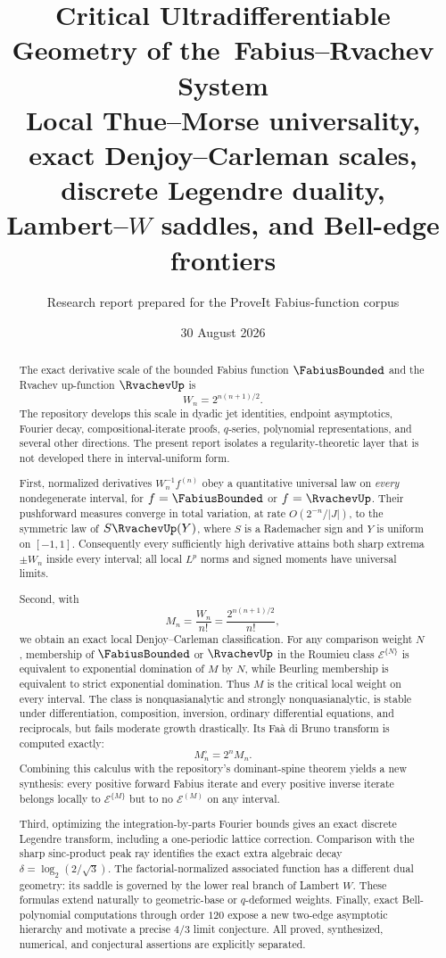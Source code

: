 \documentclass[11pt,a4paper]{article}
\title{\textbf{Critical Ultradifferentiable Geometry of the\ Fabius--Rvachev System}\\[0.55em]
\large Local Thue--Morse universality, exact Denjoy--Carleman scales,\\
discrete Legendre duality, Lambert--$W$ saddles, and Bell-edge frontiers}
\author{Research report prepared for the ProveIt Fabius-function corpus}
\date{30 August 2026}
\theoremstyle{definition}
\theoremstyle{remark}
\begin{document}
\maketitle

\begin{abstract}
The exact derivative scale of the bounded Fabius function $\FabiusBounded$ and the Rvachev
up-function $\RvachevUp$ is
\[
  W_n=2^{n(n+1)/2}.
\]
The repository develops this scale in dyadic jet identities, endpoint asymptotics,
Fourier decay, compositional-iterate proofs, $q$-series, polynomial representations,
and several other directions.  The present report isolates a regularity-theoretic
layer that is not developed there in interval-uniform form.

First, normalized derivatives $W_n^{-1}f^{(n)}$ obey a quantitative universal law
on \emph{every} nondegenerate interval, for $f=\FabiusBounded$ or $f=\RvachevUp$.  Their pushforward
measures converge in total variation, at rate $O(2^{-n}/|J|)$, to the symmetric law
of $S\RvachevUp(Y)$, where $S$ is a Rademacher sign and $Y$ is uniform on $[-1,1]$.
Consequently every sufficiently high derivative attains both sharp extrema
$\pm W_n$ inside every interval; all local $L^p$ norms and signed moments have
universal limits.

Second, with
\[
  M_n=\frac{W_n}{n!}=\frac{2^{n(n+1)/2}}{n!},
\]
we obtain an exact local Denjoy--Carleman classification.  For any comparison
weight $N$, membership of $\FabiusBounded$ or $\RvachevUp$ in the Roumieu class $\mathcal E^{\{N\}}$
is equivalent to exponential domination of $M$ by $N$, while Beurling membership
is equivalent to strict exponential domination.  Thus $M$ is the critical local
weight on every interval.  The class is nonquasianalytic and strongly
nonquasianalytic, is stable under differentiation, composition, inversion, ordinary
differential equations, and reciprocals, but fails moderate growth drastically.
Its Fa\`a di Bruno transform is computed exactly:
\[
  M_n^{\circ}=2^nM_n.
\]
Combining this calculus with the repository's dominant-spine theorem yields a new
synthesis: every positive forward Fabius iterate and every positive inverse iterate
belongs locally to $\mathcal E^{\{M\}}$ but to no $\mathcal E^{(M)}$ on any interval.

Third, optimizing the integration-by-parts Fourier bounds gives an exact discrete
Legendre transform, including a one-periodic lattice correction.  Comparison with
the sharp sinc-product peak ray identifies the exact extra algebraic decay
$\delta=\log_2(2/\sqrt3)$.  The factorial-normalized associated function has a
different dual geometry: its saddle is governed by the lower real branch of
Lambert $W$.  These formulas extend naturally to geometric-base or $q$-deformed
weights.  Finally, exact Bell-polynomial computations through order $120$ expose a
new two-edge asymptotic hierarchy and motivate a precise $4/3$ limit conjecture.
All proved, synthesized, numerical, and conjectural assertions are explicitly
separated.
\end{abstract}
\end{document}
